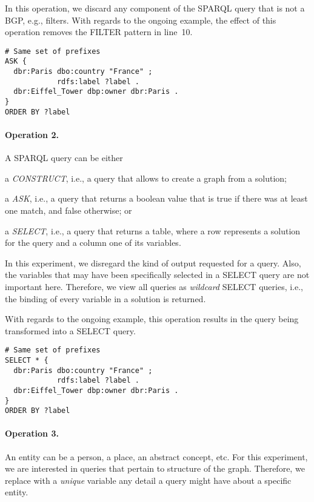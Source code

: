In this operation, we discard any component of the SPARQL query that is not a BGP, e.g., filters.
With regards to the ongoing example, the effect of this operation removes the FILTER pattern in line~10.
\begin{verbatim}
# Same set of prefixes
ASK {
  dbr:Paris dbo:country "France" ;
            rdfs:label ?label .
  dbr:Eiffel_Tower dbp:owner dbr:Paris .
}
ORDER BY ?label
\end{verbatim}

\paragraph{Operation 2.}

A SPARQL query can be either
\begin{inparaenum}[(i)]
	\item a \emph{CONSTRUCT}, i.e., a query that allows to create a graph from a solution;
	\item a \emph{ASK}, i.e., a query that returns a boolean value that is true if there was at least one match, and false otherwise; or
	\item a \emph{SELECT}, i.e., a query that returns a table, where a row represents a solution for the query and a column one of its variables.
\end{inparaenum}

In this experiment, we disregard the kind of output requested for a query. Also, the variables that may have been specifically selected in a SELECT query are not important here. Therefore, we view all queries as \emph{wildcard} SELECT queries, i.e., the binding of every variable in a solution is returned.

With regards to the ongoing example, this operation results in the query being transformed into a SELECT query.
\begin{verbatim}
# Same set of prefixes
SELECT * {
  dbr:Paris dbo:country "France" ;
            rdfs:label ?label .
  dbr:Eiffel_Tower dbp:owner dbr:Paris .
}
ORDER BY ?label
\end{verbatim}

\paragraph{Operation 3.}

An entity can be a person, a place, an abstract concept, etc. For this experiment, we are interested in queries that pertain to structure of the graph. Therefore, we replace with a \emph{unique} variable any detail a query might have about a specific entity.

